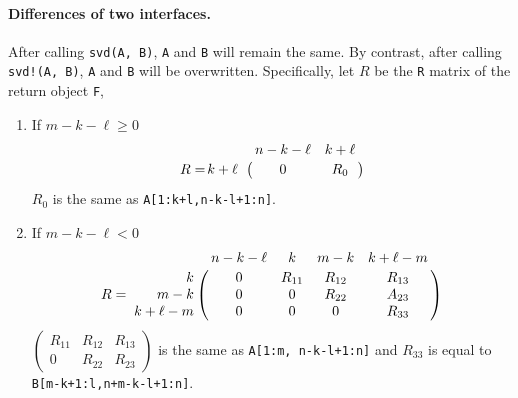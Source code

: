\paragraph{Differences of two interfaces.}
After calling \texttt{svd(A, B)}, {\tt A} and {\tt B} will remain the same. By contrast,  
after calling \texttt{svd!(A, B)}, {\tt A} and {\tt B} will be overwritten. Specifically,
let $R$ be the {\tt R} matrix of the return object {\tt F},
\begin{enumerate}
	\item If $m-k-\ell \geq 0$
		\begin{equation*}
			R = \bordermatrix{ 
               & n-k-\ell & k + \ell \cr
    			\hfill k+\ell & 0 & R_{0} \cr}
		\end{equation*}
		$R_{0}$ is the same as \texttt{A[1:k+l,n-k-l+1:n]}.
	\item If $m-k-\ell <0$
		\begin{equation*}
			R = \bordermatrix{ 
               & n-k-\ell & k & m-k & k+\ell-m \cr
               \hfill k & 0 & R_{11} & R_{12} & R_{13} \cr
    			\hfill m-k & 0 & 0 & R_{22} & A_{23} \cr
    			\hfill k+\ell-m & 0 & 0 & 0 & R_{33} \cr}
		\end{equation*}
		$\begin{pmatrix}
			R_{11} & R_{12} & R_{13} \\
			0 & R_{22} & R_{23}
		\end{pmatrix}$
		is the same as \texttt{A[1:m, n-k-l+1:n]} and $R_{33}$ is equal to 
		\texttt{B[m-k+1:l,n+m-k-l+1:n]}.
\end{enumerate}


